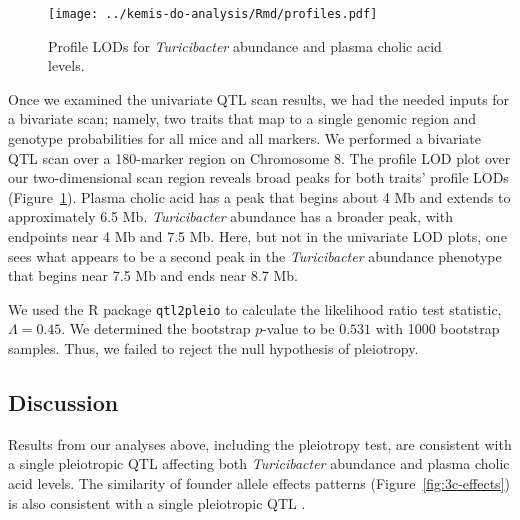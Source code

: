 \documentclass[oneside]{book}\usepackage[]{graphicx}\usepackage[]{color}
\begin{document}

\begin{figure}
\texttt{[image: ../kemis-do-analysis/Rmd/profiles.pdf]}
\caption{Profile LODs for \emph{Turicibacter} abundance and plasma cholic acid levels.}\label{fig:3c-profile}
\end{figure}

Once we examined the univariate QTL scan results, 
we had the needed inputs for a bivariate scan; namely, two traits that map to a single 
genomic region and genotype probabilities for all mice and all markers. 
We performed a bivariate QTL scan over a 180-marker region on Chromosome 8. 
The profile LOD plot over our two-dimensional scan region reveals broad peaks
for both traits' profile LODs (Figure~\ref{fig:3c-profile}). Plasma 
cholic acid has a peak that begins about 4 Mb and extends to 
approximately 6.5 Mb. \emph{Turicibacter} abundance has a broader peak, 
with endpoints near 4 Mb and 7.5 Mb. Here, but not in the univariate 
LOD plots, one sees what appears to be a second peak in the \emph{Turicibacter} 
abundance phenotype that begins near 7.5 Mb and ends near 8.7 Mb. 



We used the R package \texttt{qtl2pleio} \citep{qtl2pleio} to 
calculate the likelihood ratio test statistic, $\Lambda = 0.45$. We 
determined the bootstrap $p$-value to be $0.531$ with 1000 bootstrap 
samples. Thus, we failed to reject the null hypothesis of pleiotropy.


\subsection{Discussion}

Results from our analyses above, including the pleiotropy test, are consistent with a 
single pleiotropic QTL affecting both \emph{Turicibacter} abundance 
and plasma cholic acid levels. 
The similarity of founder allele effects patterns (Figure~\ref{fig:3c-effects}) is 
also consistent with a single pleiotropic QTL \citep{king2012genetic,macdonald2007joint}. 
\end{document}
